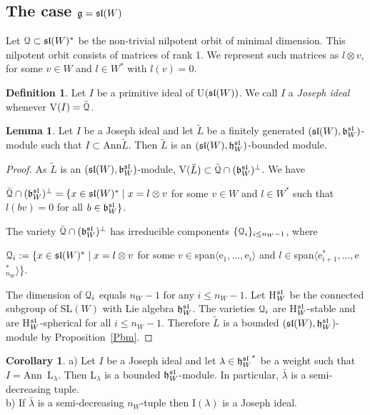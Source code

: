 \documentclass[12pt]{amsart}
\theoremstyle{definition}\newtheorem{theorem}{Theorem}[section]
\newtheorem{lemma}[proposition]{Lemma}
\newtheorem{corollary}[proposition]{Corollary}
\theoremstyle{definition}\newtheorem{definition}[proposition]{Definition}
\theoremstyle{remark}\newtheorem{example}[proposition]{Example}
\begin{document}
\subsection{The case $\frak g=\frak{sl}(W)$} Let $\EuScript Q\subset\frak{sl}(W)^*$ be the non-trivial nilpotent orbit of minimal dimension. This nilpotent orbit consists of matrices of rank 1. We represent such matrices as $l\otimes v$, for some $v\in W$ and $l\in W^*$ with $l(v)=0$.
\begin{definition} Let $I$ be a primitive ideal of U$(\frak{sl}(W))$. We call $I$ a {\it Joseph ideal} whenever V$(I)=\bar{\EuScript Q}$.\end{definition}
\begin{lemma} Let $I$ be a Joseph ideal and let $\tilde L$ be a finitely generated $(\frak{sl}(W), \frak b^\frak{sl}_W)$-module such that $I\subset$Ann$\tilde L$. Then $\tilde L$ is an $(\frak{sl}(W), \frak h^{\frak{sl}}_W)$-bounded module.\end{lemma}
\begin{proof} As $\tilde L$ is an $(\frak{sl}(W), \frak b^{\frak{sl}}_W)$-module, V($\tilde L)\subset \bar{\EuScript Q}\cap(\frak b^{\frak{sl}}_W)^\bot$. We have\begin{center}
$\bar{\EuScript Q}\cap(\frak b^{\frak{sl}}_W)^\bot=\{x\in\frak{sl}(W)^*\mid x=l\otimes v$ for some $v\in W$ and $l\in W^*$ such that $l(bv)=0$ for all $b\in\frak b^{\frak{sl}}_W\}$.\end{center}
The variety $\bar{\EuScript Q}\cap(\frak b^{\frak{sl}}_W)^\bot$ has irreducible components $\{\EuScript Q_i\}_{i\le n_W-1}$, where\begin{center}$\EuScript Q_i:=\{x\in\frak{sl}(W)^*\mid x=l\otimes v$ for some $v\in$span$\langle$e$_1,..., $e$_i\rangle$ and $l\in$span$\langle$e$_{i+1}^*, ..., $e$_{n_W}^*\rangle$\}.\end{center}
The dimension of $\EuScript Q_i$ equals $n_W-1$ for any $i\le n_W-1$. Let H$^\frak{sl}_W$ be the connected subgroup of SL$(W)$ with Lie algebra $\frak h^\frak{sl}_W$. The varieties $\EuScript Q_i$ are H$^\frak{sl}_W$-stable and are H$^\frak{sl}_W$-spherical for all $i\le n_W-1$. Therefore $\tilde L$ is a bounded $(\frak{sl}(W), \frak h^\frak{sl}_W$)-module by Proposition~\ref{Pbm}.\end{proof}
\begin{corollary}\label{Cqtoso}a) Let $I$ be a Joseph ideal and let $\lambda\in{\frak h^\frak{sl}_W}^*$ be a weight such that $I=$Ann~L$_\lambda$. Then L$_\lambda$ is a bounded $\frak h^\frak{sl}_W$-module. In particular, $\bar\lambda$ is a semi-decreasing tuple.\\b) If $\bar\lambda$ is a semi-decreasing $n_W$-tuple then I$(\lambda)$ is a Joseph ideal.\end{corollary}
\end{document}

